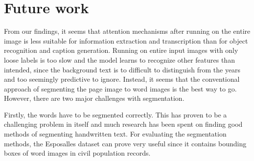 


\section{Future work}

From our findings, it seems that attention mechanisms after running on the entire image is less suitable for information extraction and transcription than for object recognition and caption generation.
Running on entire input images with only loose labels is too slow and the model learns to recognize other features than intended, since the background text is to difficult to distinguish from the years and too seemingly predictive to ignore.
Instead, it seems that the conventional approach of segmenting the page image to word images is the best way to go. However, there are two major challenges with segmentation.

Firstly, the words have to be segmented correctly. This has proven to be a challenging problem in itself and much research has been spent on finding good methods of segmenting handwritten text. For evaluating the segmentation methods, the Esposalles dataset \cite{esposalles} can prove very useful since it contains bounding boxes of word images in civil population records.

